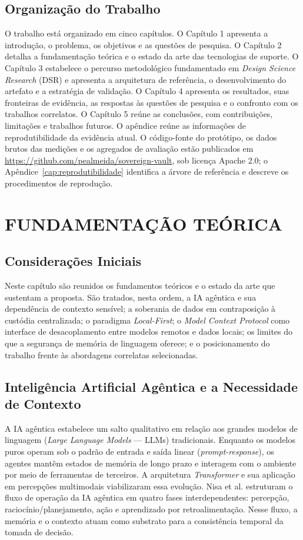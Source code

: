 \section{Organização do Trabalho}
O trabalho está organizado em cinco capítulos. O Capítulo 1 apresenta a introdução, o problema, os objetivos e as questões de pesquisa. O Capítulo 2 detalha a fundamentação teórica e o estado da arte das tecnologias de suporte. O Capítulo 3 estabelece o percurso metodológico fundamentado em \textit{Design Science Research} (DSR) e apresenta a arquitetura de referência, o desenvolvimento do artefato e a estratégia de validação. O Capítulo 4 apresenta os resultados, suas fronteiras de evidência, as respostas às questões de pesquisa e o confronto com os trabalhos correlatos. O Capítulo 5 reúne as conclusões, com contribuições, limitações e trabalhos futuros. O apêndice reúne as informações de reprodutibilidade da evidência atual. O código-fonte do protótipo, os dados brutos das medições e os agregados de avaliação estão publicados em \url{https://github.com/pealmeida/sovereign-vault}, sob licença Apache 2.0; o Apêndice~\ref{cap:reprodutibilidade} identifica a árvore de referência e descreve os procedimentos de reprodução.

\chapter{FUNDAMENTAÇÃO TEÓRICA}
\section{Considerações Iniciais}
Neste capítulo são reunidos os fundamentos teóricos e o estado da arte que sustentam a proposta. São tratados, nesta ordem, a IA agêntica e sua dependência de contexto sensível; a soberania de dados em contraposição à custódia centralizada; o paradigma \textit{Local-First}; o \textit{Model Context Protocol} como interface de desacoplamento entre modelos remotos e dados locais; os limites do que a segurança de memória de linguagem oferece; e o posicionamento do trabalho frente às abordagens correlatas selecionadas.

\section{Inteligência Artificial Agêntica e a Necessidade de Contexto}
A IA agêntica estabelece um salto qualitativo em relação aos grandes modelos de linguagem (\textit{Large Language Models} --- LLMs) tradicionais. Enquanto os modelos puros operam sob o padrão de entrada e saída linear (\textit{prompt-response}), os agentes mantêm estados de memória de longo prazo e interagem com o ambiente por meio de ferramentas de terceiros. A arquitetura \textit{Transformer} \cite{vaswani2017} e sua aplicação em percepções multimodais \cite{khan2022} viabilizaram essa evolução. Nisa et al. \cite{nisa2025} estruturam o fluxo de operação da IA agêntica em quatro fases interdependentes: percepção, raciocínio/planejamento, ação e aprendizado por retroalimentação. Nesse fluxo, a memória e o contexto atuam como substrato para a consistência temporal da tomada de decisão.

